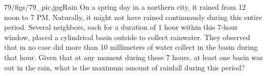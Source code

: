 \begin{problem}{79/figs/79_pic.jpg}{Rain} On a spring day in a northern city, it rained from 12 noon to 7 PM. Naturally, it might not have rained continuously during this entire period. Several neighbors, each for a duration of 1 hour within this 7-hour window, placed a cylindrical basin outside to collect rainwater. They observed that in no case did more than 10 millimeters of water collect in the basin during that hour. Given that at any moment during these 7 hours, at least one basin was out in the rain, what is the maximum amount of rainfall during this period?
\end{problem}

